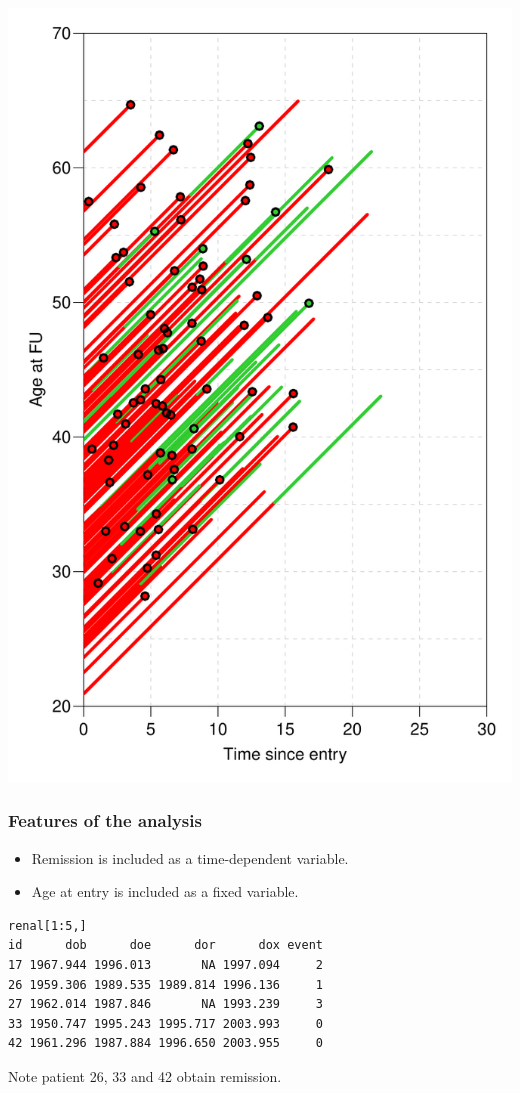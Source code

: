 \begin{frame}
\includegraphics[height=\textheight,keepaspectratio]{./Ren-Lexis0}
\end{frame}

\begin{frame}[fragile]
   \frametitle{Features of the analysis}
\begin{itemize}
\item Remission is included as a time-dependent variable.
\item Age at entry is included as a fixed variable.
\end{itemize}
\small
\renewcommand{\baselinestretch}{0.9}
\begin{verbatim}
renal[1:5,]
id      dob      doe      dor      dox event
17 1967.944 1996.013       NA 1997.094     2
26 1959.306 1989.535 1989.814 1996.136     1
27 1962.014 1987.846       NA 1993.239     3
33 1950.747 1995.243 1995.717 2003.993     0
42 1961.296 1987.884 1996.650 2003.955     0
\end{verbatim}
\renewcommand{\baselinestretch}{1.0}
\normalsize
Note patient 26, 33 and 42 obtain remission.
\end{frame}

